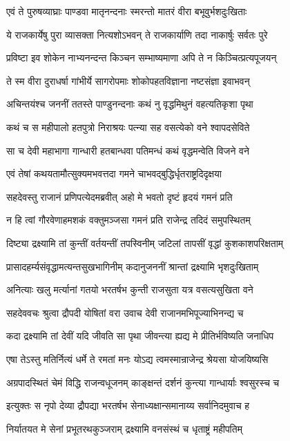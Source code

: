 \twolineshloka
{एवं ते पुरुषव्याघ्राः पाण्डवा मातृनन्दनाः}
{स्मरन्तो मातरं वीरा बभूवुर्भशदुःखिताः}


\twolineshloka
{ये राजकार्येषु पुरा व्यासक्ता नित्यशोऽभवन्}
{ते राजकार्याणि तदा नाकार्षुः सर्वतः पुरे}


\twolineshloka
{प्रविष्टा इव शोकेन नाभ्यनन्दन्त किञ्चन}
{सम्भाष्यमाणा अपि ते न किञ्चित्प्रत्यपूजयन्}


\twolineshloka
{ते स्म वीरा दुराधर्षा गांभीर्ये सागरोपमाः}
{शोकोपहतविज्ञाना नष्टसंज्ञा इवाभवन्}


\twolineshloka
{अचिन्तयंश्च जननीं ततस्ते पाण्डुनन्दनाः}
{कथं नु वृद्धमिथुनं वहत्यतिकृशा पृथा}


\twolineshloka
{कथं च स महीपालो हतपुत्रो निराश्रयः}
{पत्न्या सह वसत्येको वने श्वापदसेविते}


\twolineshloka
{सा च देवी महाभागा गान्धारी हतबान्धवा}
{पतिमन्धं कथं वृद्धमन्वेति विजने वने}


\twolineshloka
{एवं तेषां कथयतामौत्सुक्यमभवत्तदा}
{गमने चाभवद्बुद्धिर्धृतराष्ट्रदिदृक्षया}


\threelineshloka
{सहदेवस्तु राजानं प्रणिपत्येदमब्रवीत्}
{अहो मे भवतो दृष्टं हृदयं गमनं प्रति}
{}


\twolineshloka
{न हि त्वां गौरवेणाहमशकं वक्तुमञ्जसा}
{गमनं प्रति राजेन्द्र तदिदं समुपस्थितम्}


\twolineshloka
{दिष्ट्या द्रक्ष्यामि तां कुन्तीं वर्तयन्तीं तपस्विनीम्}
{जटिलां तापसीं वृद्धां कुशकाशपरिक्षताम्}


\twolineshloka
{प्रासादहर्म्यसंवृद्धामत्यन्तसुखभागिनीम्}
{कदानुजननीं श्रान्तां द्रक्ष्यामि भृशदुःखिताम्}


\twolineshloka
{अनित्याः खलु मर्त्यानां गतयो भरतर्षभ}
{कुन्ती राजसुता यत्र वसत्यसुखिता वने}


\threelineshloka
{सहदेववचः श्रुत्वा द्रौपदी योषितां वरा}
{उवाच देवी राजानमभिपूज्याभिनन्द्य च}
{}


\twolineshloka
{कदा द्रक्ष्यामि तां देवीं यदि जीवति सा पृथा}
{जीवन्त्या ह्यद्य मे प्रीतिर्भविष्यति जनाधिप}


\twolineshloka
{एषा तेऽस्तु मतिर्नित्यं धर्मे ते रमतां मनः}
{योऽद्य त्वमस्मान्राजेन्द्र श्रेयसा योजयिष्यसि}


\twolineshloka
{अग्रपादस्थितं चेमं विद्धि राजन्वधूजनम्}
{काङ्क्षन्तं दर्शनं कुन्त्या गान्धार्याः श्वसुरस्च च}


\twolineshloka
{इत्युक्तः स नृपो देव्या द्रौपद्या भरतर्षभ}
{सेनाध्यक्षान्समानाय्य सर्वानिदमुवाच ह}


\twolineshloka
{निर्यातयत मे सेनां प्रभूतरथकुञ्जराम्}
{द्रक्ष्यामि वनसंस्थं च धृताष्ट्रं महीपतिम्}


